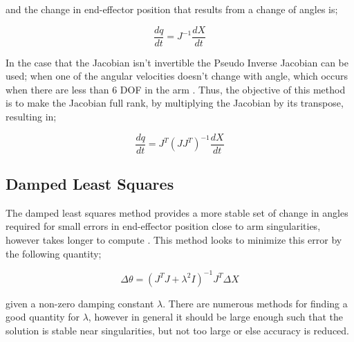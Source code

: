 \documentclass[12pt,openany,a4paper]{book}
\begin{document}
\vspace{\baselineskip}
and the change in end-effector position that results from a change of angles is;

\vspace{\baselineskip}
\begin{equation}
\frac{dq}{dt} = J^{-1} \frac{dX}{dt}
\end{equation}

\vspace{\baselineskip}
In the case that the Jacobian isn't invertible the Pseudo Inverse Jacobian can be used; when one of the angular velocities doesn't change with angle, which occurs when there are less than 6 DOF in the arm \cite{jacobian}. Thus, the objective of this method is to make the Jacobian full rank, by multiplying the Jacobian by its transpose, resulting in;

\vspace{\baselineskip}
\begin{equation}
\frac{dq}{dt} = J^T (J J^T)^{-1} \frac{dX}{dt} 
\end{equation}

\vspace{\baselineskip}
\subsection{Damped Least Squares}
The damped least squares method provides a more stable set of change in angles required for small errors in end-effector position close to arm singularities, however takes longer to compute \cite{jacobian}. This method looks to minimize this error by the following quantity;

\vspace{\baselineskip}
\begin{equation}
\Delta \theta = (J^T J + \lambda^2 I)^{-1} J^T \Delta X
\end{equation}

\vspace{\baselineskip}
given a non-zero damping constant $\lambda$. There are numerous methods for finding a good quantity for $\lambda$, however in general it should be large enough such that the solution is stable near singularities, but not too large or else accuracy is reduced.

\end{document}
